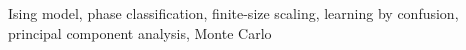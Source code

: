 Ising model, phase classification, finite-size scaling, learning by confusion, principal component analysis, Monte Carlo
